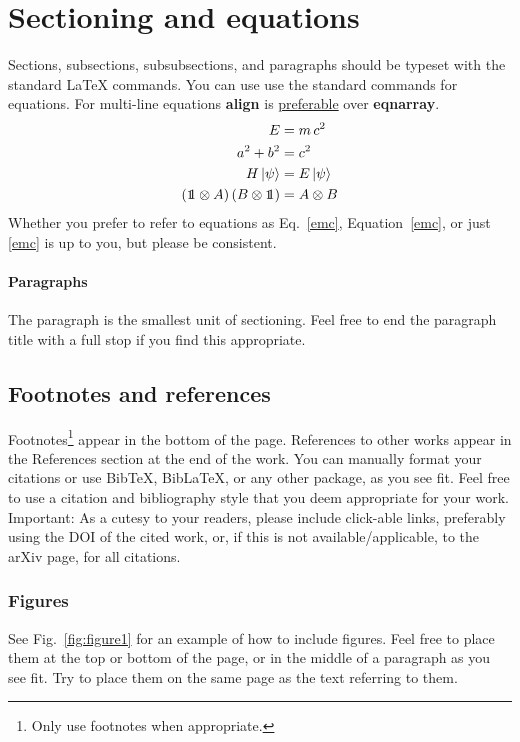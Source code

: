 \documentclass[prx,a4paper,aps,twocolumn,superscriptaddress,11p]{quantumarticle}
\begin{document}
\section{Sectioning and equations}
\label{sec:sec1}
Sections, subsections, subsubsections, and paragraphs should be typeset with the standard LaTeX commands.
You can use use the standard commands for equations.
For multi-line equations \textbf{align} is \href{http://tex.stackexchange.com/questions/196/eqnarray-vs-align}{preferable} over \textbf{eqnarray}.
\begin{align}
  \label{emc}
  E &= m\,c^2\\
  a^2 + b^2 &= c^2\\
  H\,|\psi\rangle &= E\,|\psi\rangle\\
  ({\mbox{\small1}\normalsize\mkern-5.5mu1} \otimes A)\,(B \otimes {\mbox{\small1}\normalsize\mkern-5.5mu1}) &= A \otimes B
\end{align}
Whether you prefer to refer to equations as Eq.~\eqref{emc}, Equation~\ref{emc}, or just \eqref{emc} is up to you, but please be consistent.

\paragraph{Paragraphs}
The paragraph is the smallest unit of sectioning.
Feel free to end the paragraph title with a full stop if you find this appropriate.

\subsection{Footnotes and references}
\label{sec:subsec1}
Footnotes\footnote{Only use footnotes when appropriate.} appear in the bottom of the page.
References to other works \cite{Foo2035} appear in the References section at the end of the work.
You can manually format your citations or use BibTeX, BibLaTeX, or any other package, as you see fit.
Feel free to use a citation and bibliography style that you deem appropriate for your work.
Important: As a cutesy to your readers, please include click-able links, preferably using the DOI of the cited work, or, if this is not available/applicable, to the arXiv page, for all citations.  

\subsubsection{Figures}
See Fig.~\ref{fig:figure1} for an example of how to include figures.
Feel free to place them at the top or bottom of the page, or in the middle of a paragraph as you see fit.
Try to place them on the same page as the text referring to them.
\end{document}
